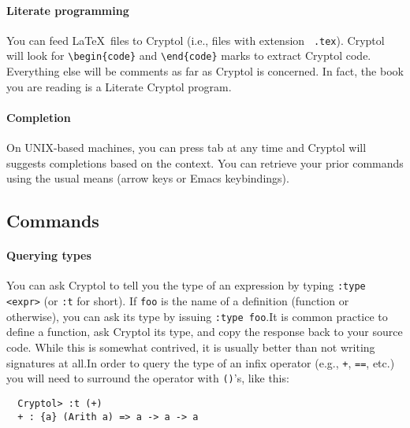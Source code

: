 

\paragraph*{Literate programming} 
You can feed \LaTeX~files to Cryptol (i.e., files with extension {\tt
  .tex}).  Cryptol will look for \verb|\begin{code}| and
  \verb|\end{code}| marks to extract Cryptol code.  Everything else
will be comments as far as Cryptol is concerned.  In fact, the book
you are reading is a Literate Cryptol program.\indLiterateProgramming


\paragraph*{Completion}
On UNIX-based machines, you can press tab at any time and Cryptol will
suggests completions based on the context.  You can retrieve your
prior commands using the usual means (arrow keys or Emacs
keybindings).\indCompletion


\subsection{Commands}
\label{sec:commands}

\paragraph*{Querying types}
You can ask Cryptol to tell you the type of an expression by typing
{\tt :type <expr>} (or {\tt :t} for short). If {\tt foo} is the name
of a definition (function or otherwise), you can ask its type by
issuing {\tt :type foo}.\indCmdType It is common practice to define a
function, ask Cryptol its type, and copy the response back to your
source code.  While this is somewhat contrived, it is usually better
than not writing signatures at all.\indSignature In order to query the
type of an infix operator (e.g., {\tt +}, {\tt ==}, etc.)  you will need
to surround the operator with {\tt ()}'s, like this:
\begin{Verbatim}
  Cryptol> :t (+)
  + : {a} (Arith a) => a -> a -> a
\end{Verbatim}

